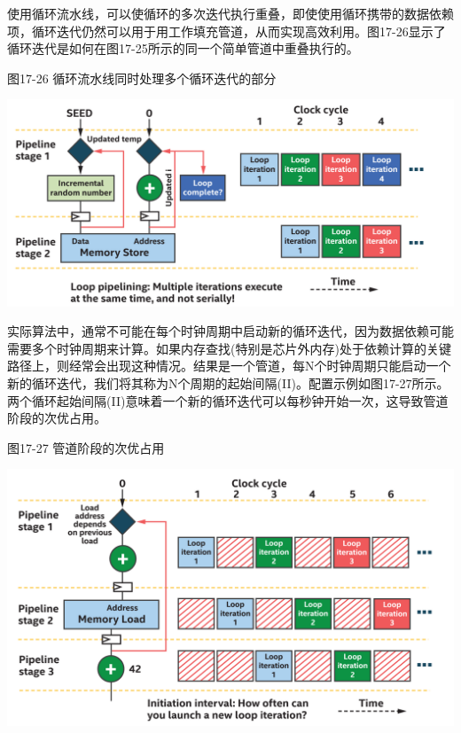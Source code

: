 使用循环流水线，可以使循环的多次迭代执行重叠，即使使用循环携带的数据依赖项，循环迭代仍然可以用于用工作填充管道，从而实现高效利用。图17-26显示了循环迭代是如何在图17-25所示的同一个简单管道中重叠执行的。\par

\hspace*{\fill} \par %
图17-26 循环流水线同时处理多个循环迭代的部分
\begin{center}
	\includegraphics[width=1.0\textwidth]{content/chapter-17/images/21}
\end{center}

实际算法中，通常不可能在每个时钟周期中启动新的循环迭代，因为数据依赖可能需要多个时钟周期来计算。如果内存查找(特别是芯片外内存)处于依赖计算的关键路径上，则经常会出现这种情况。结果是一个管道，每N个时钟周期只能启动一个新的循环迭代，我们将其称为N个周期的起始间隔(II)。配置示例如图17-27所示。两个循环起始间隔(II)意味着一个新的循环迭代可以每秒钟开始一次，这导致管道阶段的次优占用。\par

\hspace*{\fill} \par %
图17-27 管道阶段的次优占用
\begin{center}
	\includegraphics[width=1.0\textwidth]{content/chapter-17/images/22}
\end{center}

